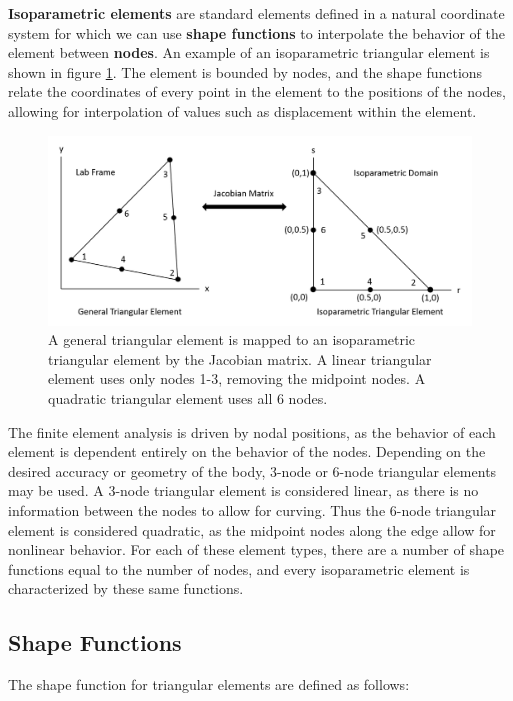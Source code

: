 \documentclass[]{spie}  %
\begin{document}
\textbf{Isoparametric elements} are standard elements defined in a natural coordinate system for which we can use \textbf{shape functions} to interpolate the behavior of the element between \textbf{nodes}. An example of an isoparametric triangular element is shown in figure \ref{fig: isoparametric triangular element}. The element is bounded by nodes, and the shape functions relate the coordinates of every point in the element to the positions of the nodes, allowing for interpolation of values such as displacement within the element.

\begin{figure}[h]
	\centering
	\includegraphics[width=7in]{isoparametric_triangular_element.png}
	\caption{A general triangular element is mapped to an isoparametric triangular element by the Jacobian matrix. A linear triangular element uses only nodes 1-3, removing the midpoint nodes. A quadratic triangular element uses all 6 nodes.} 
	\label{fig: isoparametric triangular element}
\end{figure}

The finite element analysis is driven by nodal positions, as the behavior of each element is dependent entirely on the behavior of the nodes. Depending on the desired accuracy or geometry of the body, 3-node or 6-node triangular elements may be used. A 3-node triangular element is considered linear, as there is no information between the nodes to allow for curving. Thus the 6-node triangular element is considered quadratic, as the midpoint nodes along the edge allow for nonlinear behavior. For each of these element types, there are a number of shape functions equal to the number of nodes, and every isoparametric element is characterized by these same functions.

\subsection{Shape Functions}
The shape function for triangular elements are defined as follows:
\end{document}
